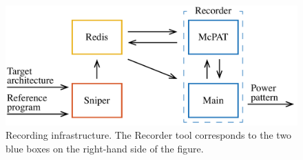 \begin{figure}
  \centering
  \includegraphics[width=1.0\columnwidth]{include/assets/figures/recorder.pdf}
  \caption{
    Recording infrastructure. The Recorder tool corresponds to the two blue
    boxes on the right-hand side of the figure.
  }
\end{figure}
